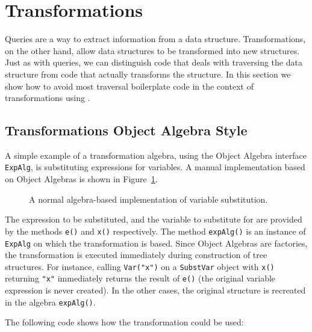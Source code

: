 \section{Transformations}\label{sec:transformations}
\label{retroimp}

Queries are a way to extract information from a data structure.
Transformations, on the other hand, allow data structures to be
transformed into new structures. Just as with queries, we can distinguish code that deals with
traversing the data structure from code that actually transforms the
structure. In this section we show how to avoid most traversal
boilerplate code in the context of transformations using \name.


\subsection{Transformations Object Algebra Style}\label{subsec:substvars}

A simple example of a transformation algebra, using the Object
Algebra interface \lstinline{ExpAlg}, is substituting expressions for
variables. A manual implementation based on Object Algebras is shown
in Figure~\ref{substvars_without_id}.

\begin{figure}[t]
\nocaptionrule
\caption{A normal algebra-based implementation of variable substitution.}
\label{substvars_without_id}
\end{figure}

The expression to be substituted, and the variable to substitute for
are provided by the methods \lstinline{e()} and \lstinline{x()}
respectively. The method \lstinline{expAlg()} is an instance of
\lstinline{ExpAlg} on which the transformation is based. Since Object
Algebras are factories, the transformation is executed immediately
during construction of tree structures. For instance, calling \lstinline{Var("x")} on a
\lstinline{SubstVar} object with \lstinline{x()} returning
\lstinline{"x"} immediately returns the result of \lstinline{e()}
(the original variable expression is never created). In the other
cases, the original structure is recreated in the algebra
\lstinline{expAlg()}.

The following code shows how the transformation could be used:


